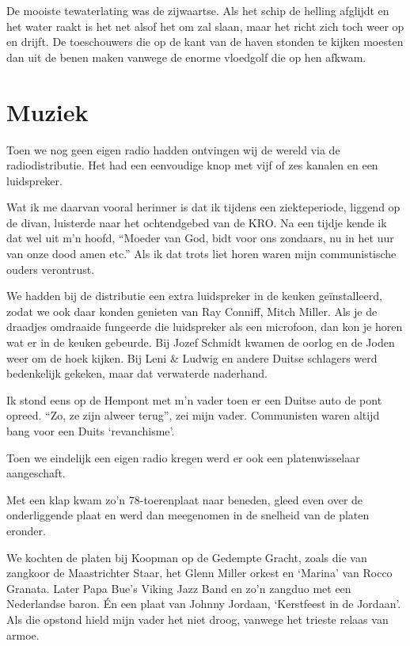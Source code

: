\documentclass[10pt,twoside,openright]{memoir}
\begin{document}
De mooiste tewaterlating was de zijwaartse. Als het schip de helling afglijdt en het water raakt is het net alsof het om zal slaan, maar het richt zich toch weer op en drijft. De toeschouwers die op de kant van de haven stonden te kijken moesten dan uit de benen maken vanwege de enorme vloedgolf die op hen afkwam.

\chapter{Muziek} %
\label{cha:muziek}

Toen we nog geen eigen radio hadden ontvingen wij de wereld via de radiodistributie. Het had een eenvoudige knop met vijf of zes kanalen en een luidspreker. 

Wat ik me daarvan vooral herinner is dat ik tijdens een ziekteperiode, liggend op de divan, luisterde naar het ochtendgebed van de KRO. Na een tijdje kende ik dat wel uit m’n hoofd, ``Moeder van God, bidt voor ons zondaars, nu in het uur van onze dood amen etc.'' Als ik dat trots liet horen waren mijn communistische ouders verontrust. 

We hadden bij de distributie een extra luidspreker in de keuken geïnstalleerd, zodat we ook daar konden genieten van Ray Conniff, Mitch Miller. Als je de draadjes omdraaide fungeerde die luidspreker als een microfoon, dan kon je horen wat er in de keuken gebeurde. Bij Jozef Schmidt kwamen de oorlog en de Joden weer om de hoek kijken. Bij Leni \& Ludwig en andere Duitse schlagers werd bedenkelijk gekeken, maar dat verwaterde naderhand. 

Ik stond eens op de Hempont met m’n vader toen er een Duitse auto de pont opreed. ``Zo, ze zijn alweer terug'', zei mijn vader. Communisten waren altijd bang voor een Duits `revanchisme’.

Toen we eindelijk een eigen radio kregen werd er ook een platenwisselaar aangeschaft. 

Met een klap kwam zo’n 78-toerenplaat naar beneden, gleed even over de onderliggende plaat en werd dan meegenomen in de snelheid van de platen eronder. 

We kochten de platen bij Koopman op de Gedempte Gracht, zoals die van zangkoor de Maastrichter Staar, het Glenn Miller orkest en `Marina' van Rocco Granata. Later Papa Bue’s Viking Jazz Band en zo’n zangduo met een Nederlandse baron. Én een plaat van Johnny Jordaan, ‘Kerstfeest in de Jordaan’. Als die opstond hield mijn vader het niet droog, vanwege het trieste relaas van armoe. 
\end{document}
